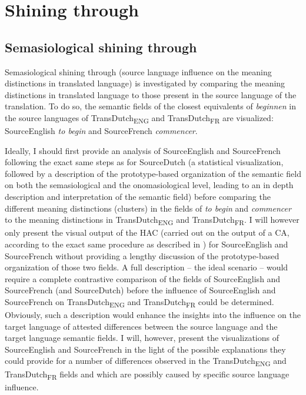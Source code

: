 \section{Shining through}\label{sec:4.6}  
\subsection{Semasiological shining through}\label{sec:4.6.1}  
Semasiological shining through (source language influence on the meaning distinctions in translated language) is investigated by comparing the meaning distinctions in translated language to those present in the source language of the translation. To do so, the semantic fields of the closest equivalents of \textit{beginnen} in the source languages of TransDutch\textsubscript{ENG} and TransDutch\textsubscript{FR} are visualized: SourceEnglish \textit{to begin} and SourceFrench \textit{commencer}.

Ideally, I should first provide an analysis of SourceEnglish and SourceFrench following the exact same steps as for SourceDutch (a statistical visualization, followed by a description of the prototype-based organization of the semantic field on both the semasiological and the onomasiological level, leading to an in depth description and interpretation of the semantic field) before comparing the different meaning distinctions (clusters) in the fields of \textit{to begin} and \textit{commencer} to the meaning distinctions in TransDutch\textsubscript{ENG} and TransDutch\textsubscript{FR}. I will however only present the visual output of the HAC (carried out on the output of a CA, according to the exact same procedure as described in ) for SourceEnglish and SourceFrench without providing a lengthy discussion of the prototype-based organization of those two fields. A full description – the ideal scenario – would require a complete contrastive comparison of the fields of SourceEnglish and SourceFrench (and SourceDutch) before the influence of SourceEnglish and SourceFrench on TransDutch\textsubscript{ENG} and TransDutch\textsubscript{FR} could be determined. Obviously, such a description would enhance the insights into the influence on the target language of attested differences between the source language and the target language semantic fields. I will, however, present the visualizations of SourceEnglish and SourceFrench in the light of the possible explanations they could provide for a number of differences observed in the TransDutch\textsubscript{ENG} and TransDutch\textsubscript{FR} fields and which are possibly caused by specific source language influence.

